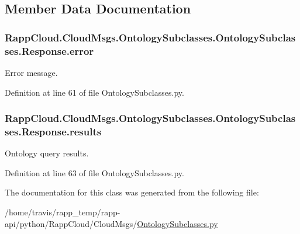 \subsection{Member Data Documentation}
\hypertarget{classRappCloud_1_1CloudMsgs_1_1OntologySubclasses_1_1OntologySubclasses_1_1Response_ad49d4961e2d60656e98bfa017946a918}{
\subsubsection[{error}]{\setlength{\rightskip}{0pt plus 5cm}Rapp\-Cloud.\-Cloud\-Msgs.\-Ontology\-Subclasses.\-Ontology\-Subclasses.\-Response.\-error}}\label{classRappCloud_1_1CloudMsgs_1_1OntologySubclasses_1_1OntologySubclasses_1_1Response_ad49d4961e2d60656e98bfa017946a918}


Error message. 



Definition at line 61 of file Ontology\-Subclasses.\-py.

\hypertarget{classRappCloud_1_1CloudMsgs_1_1OntologySubclasses_1_1OntologySubclasses_1_1Response_a90df55871a3c1cbc4b7aa9d98e070910}{
\subsubsection[{results}]{\setlength{\rightskip}{0pt plus 5cm}Rapp\-Cloud.\-Cloud\-Msgs.\-Ontology\-Subclasses.\-Ontology\-Subclasses.\-Response.\-results}}\label{classRappCloud_1_1CloudMsgs_1_1OntologySubclasses_1_1OntologySubclasses_1_1Response_a90df55871a3c1cbc4b7aa9d98e070910}


Ontology query results. 



Definition at line 63 of file Ontology\-Subclasses.\-py.



The documentation for this class was generated from the following file\-:\begin{DoxyCompactItemize}
\item 
/home/travis/rapp\-\_\-temp/rapp-\/api/python/\-Rapp\-Cloud/\-Cloud\-Msgs/\hyperlink{OntologySubclasses_8py}{Ontology\-Subclasses.\-py}\end{DoxyCompactItemize}

